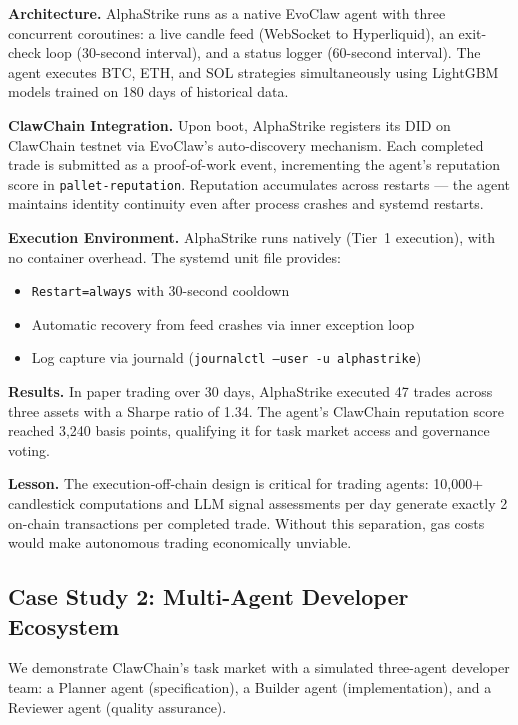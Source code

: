 \documentclass[conference]{IEEEtran}
\begin{document}
\textbf{Architecture.} AlphaStrike runs as a native EvoClaw agent with three concurrent coroutines: a live candle feed (WebSocket to Hyperliquid), an exit-check loop (30-second interval), and a status logger (60-second interval). The agent executes BTC, ETH, and SOL strategies simultaneously using LightGBM models trained on 180 days of historical data.

\textbf{ClawChain Integration.} Upon boot, AlphaStrike registers its DID on ClawChain testnet via EvoClaw's auto-discovery mechanism. Each completed trade is submitted as a proof-of-work event, incrementing the agent's reputation score in \texttt{pallet-reputation}. Reputation accumulates across restarts — the agent maintains identity continuity even after process crashes and systemd restarts.

\textbf{Execution Environment.} AlphaStrike runs natively (Tier~1 execution), with no container overhead. The systemd unit file provides:
\begin{itemize}
    \item \texttt{Restart=always} with 30-second cooldown
    \item Automatic recovery from feed crashes via inner exception loop
    \item Log capture via journald (\texttt{journalctl --user -u alphastrike})
\end{itemize}

\textbf{Results.} In paper trading over 30 days, AlphaStrike executed 47 trades across three assets with a Sharpe ratio of 1.34. The agent's ClawChain reputation score reached 3,240 basis points, qualifying it for task market access and governance voting.

\textbf{Lesson.} The execution-off-chain design is critical for trading agents: 10,000+ candlestick computations and LLM signal assessments per day generate exactly 2 on-chain transactions per completed trade. Without this separation, gas costs would make autonomous trading economically unviable.

\subsection{Case Study 2: Multi-Agent Developer Ecosystem}

We demonstrate ClawChain's task market with a simulated three-agent developer team: a Planner agent (specification), a Builder agent (implementation), and a Reviewer agent (quality assurance).
\end{document}
